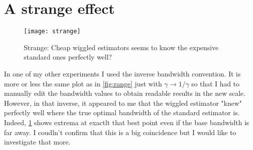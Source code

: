 \documentclass[12pt]{amsart}
\begin{document}
\appendix
\section{A strange effect} \label{app:strange}

\begin{figure}[htp]
    \centering
    \texttt{[image: strange]}
    \caption{Strange: Cheap wiggled estimators seems to know the expensive 
        standard ones perfectly well?}
    \label{fig:strange}
\end{figure}

In one of my other experiments I used the inverse bandwidth convention.
It is more or less the same plot as in \cref{fig:range} just with 
$\gamma \to 1/\gamma$ so that I had to manually edit the bandwidth 
values to obtain readable results in the new scale.
However, in that inverse, it appeared to me that the wiggled estimator
"knew" perfectly well where the true optimal bandwidth of the standard 
estimator is.
Indeed, \cref{fig:strange} shows extrema at exactlt that best point 
even if the base bandwidth is far away.
I coudln't confirm that this is a big coincidence but I would like to 
investigate that more.
\end{document}
